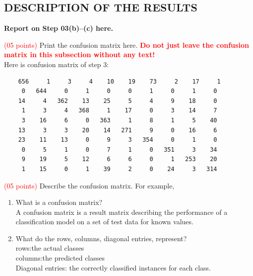 \documentclass[dvipsnames,12pt]{article} %
\newcommand{\Brd}[1]{{\textbf{\textcolor{Red}{#1}}}}               %
\newcommand{\Brm}[1]{\textbf{\textcolor[rgb]{0.69,0.19,0.38}{#1}}} %
\begin{document}
      \subsection{DESCRIPTION OF THE RESULTS}
       \label{SUBSECT 3.2:CENTROID RESULTS}

        \Brm{Report on Step 03(b)--(c) here.}

          \vspace{06pt}

          \textcolor{red}{(05 points)}  Print the confusion matrix here.
          \Brd{Do not just leave the confusion matrix in this subsection without any text!}\\
          
          Here is confusion matrix of step 3:\\
        \begin{verbatim}    
    656     1     3     4    10    19    73     2    17     1
     0   644     0     1     0     0     1     0     1     0
    14     4   362    13    25     5     4     9    18     0
     1     3     4   368     1    17     0     3    14     7
     3    16     6     0   363     1     8     1     5    40
    13     3     3    20    14   271     9     0    16     6
    23    11    13     0     9     3   354     0     1     0
     0     5     1     0     7     1     0   351     3    34
     9    19     5    12     6     6     0     1   253    20
     1    15     0     1    39     2     0    24     3   314
        \end{verbatim}
          \vspace{06pt}

          \textcolor{red}{(05 points)}  Describe the confusion matrix.  For example,

          \begin{enumerate}

            \item  What is a confusion matrix?\\
            A confusion matrix is a result matrix describing the performance of a classification model on a set of test data for known values.

            \item What do the rows, columns, diagonal entries, represent?\\
            rows:the actual classes\\
            columns:the predicted classes\\
            Diagonal entries: the correctly classified instances for each class.\\
          \end{enumerate}
\end{document}
